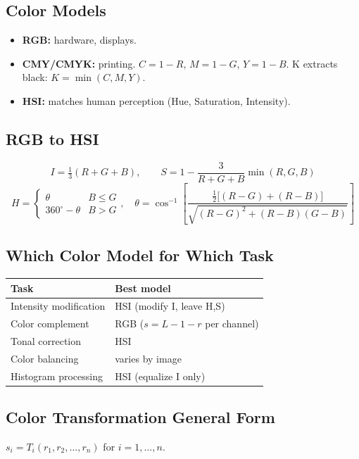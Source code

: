 \documentclass[10pt]{article}
\begin{document}
\subsection{Color Models}
\begin{itemize}
  \item \textbf{RGB:} hardware, displays.
  \item \textbf{CMY/CMYK:} printing. $C=1-R$, $M=1-G$, $Y=1-B$. K extracts black: $K=\min(C,M,Y)$.
  \item \textbf{HSI:} matches human perception (Hue, Saturation, Intensity).
\end{itemize}

\subsection{RGB to HSI}
\begin{tcolorbox}[studybox]
\[
I = \tfrac{1}{3}(R+G+B), \qquad
S = 1 - \frac{3}{R+G+B}\min(R,G,B)
\]
\[
H = \begin{cases}\theta & B \le G \\ 360^{\circ}-\theta & B > G\end{cases},\quad
\theta = \cos^{-1}\!\left[\frac{\tfrac{1}{2}\bigl[(R-G)+(R-B)\bigr]}{\sqrt{(R-G)^2 + (R-B)(G-B)}}\right]
\]
\end{tcolorbox}

\subsection{Which Color Model for Which Task}
\begin{tcolorbox}[studybox]
\begin{tabular}{@{}ll@{}}
\toprule
\textbf{Task} & \textbf{Best model} \\
\midrule
Intensity modification & HSI (modify I, leave H,S) \\
Color complement & RGB ($s=L-1-r$ per channel) \\
Tonal correction & HSI \\
Color balancing & varies by image \\
Histogram processing & HSI (equalize I only) \\
\bottomrule
\end{tabular}
\end{tcolorbox}

\subsection{Color Transformation General Form}
\(s_i = T_i(r_1, r_2, \dots, r_n)\) for $i=1,\dots,n$.
\end{document}
